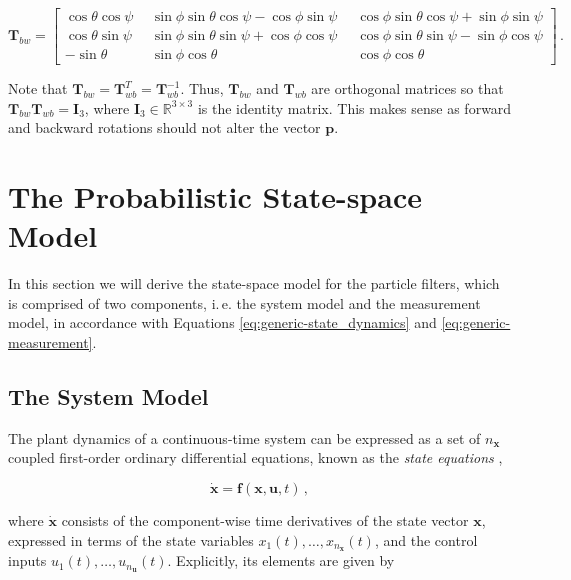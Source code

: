 \begin{equation}\label{eq:cbw}
\bm{T}_{bw} = {\left[\begin{smallmatrix}
   \cos \theta \cos \psi \; &
    \sin \phi \sin \theta \cos \psi - \cos \phi \sin \psi \; &
    \cos \phi \sin \theta \cos \psi + \sin \phi \sin \psi \\
    \cos \theta \sin \psi \;\; &
    \sin \phi \sin \theta \sin \psi + \cos \phi \cos \psi \;\; &
    \cos \phi \sin \theta \sin \psi - \sin \phi \cos \psi \\
    -\sin \theta \;\; &
    \sin \phi \cos \theta \;\; &
    \cos \phi \cos \theta
  \end{smallmatrix}\right]}\,.
\end{equation}

\noindent
Note that $\bm{T}_{bw} = \bm{T}^T_{wb} = \bm{T}^{-1}_{wb}$. Thus, $\bm{T}^{ }_{bw}$ and $\bm{T}_{wb}$ are orthogonal matrices so that $\bm{T}^{ }_{bw} \bm{T}_{wb} = \bm{I}_3$, where $\bm{I}_3 \in \mathbb{R}^{3 \times 3}$ is the identity matrix. This makes sense as forward and backward rotations should not alter the vector $\bm{p}$.


\section{The Probabilistic State-space Model}\label{sec:prob_model}

In this section we will derive the state-space model for the particle filters, which is comprised of two components, i.\,e. the system model and the measurement model, in accordance with Equations \ref{eq:generic-state_dynamics} and \ref{eq:generic-measurement}.

\subsection{The System Model}\label{sec:system_model_prob}

The plant dynamics of a continuous-time system can be expressed as a set of $n_{\bm{x}}$ coupled first-order ordinary differential equations, known as the \emph{state equations} \cite{rowell2002state}, 

\begin{equation} \label{eq:state_vector_derivative}
  \dot{\bm{x}} = \bm{f}(\bm{x}, \bm{u}, t)\,,
\end{equation}

\noindent
where $\dot{\bm{x}}$ consists of the component-wise time derivatives of the state vector $\bm{x}$, expressed in terms of the state variables $x_1(t), \dots, x_{n_{\bm{x}}}(t)$, and the control inputs $u_1(t), \dots, u_{n_{\bm{u}}}(t)$. Explicitly, its elements are given by

